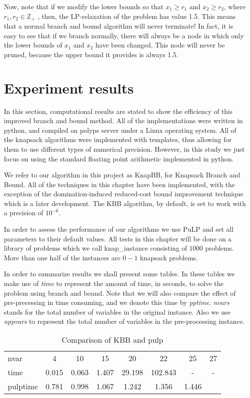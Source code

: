 \documentclass[a4paper,11pt]{article}
\begin{document}
Now, note that if we modify the lower bounds so that $x_1\geq r_1$ and $x_2 \geq r_2$, where $r_1 , r_2 \in \mathbb Z_+$ , then, the LP-relaxation of the problem has value 1.5. This means that a normal branch and bound algorithm will never terminate! In fact, it is easy to see that if we branch normally, there will always be a node in which only the lower bounds of $x_1$ and $x_2$ have been changed. This node will never be pruned, because the upper bound it provides is always 1.5.

\section{Experiment results}
In this section, computational results are stated to show the efficiency of this improved branch and bound method. All of the implementations were written in python, and compiled on polyps server under a Linux operating system. All of the knapsack algorithms were implemented with templates, thus allowing for them to use different types of numerical precision. However, in this study we just focus on using the standard floating point arithmetic implemented in python.

We refer to our algorithm in this project as KnapBB, for Knapsack Branch and Bound. All of the techniques in this chapter have been implemented, with the exception of the domination-induced reduced-cost bound improvement technique which is a later development. The KBB algorithm, by default, is set to work with a precision of $10^{-6}$.

In order to assess the performance of our algorithms we use PuLP and set all parameters to their default values. All tests in this chapter will be done on a library of problems which we call knap\_instance consisting of $1000$ problems. More than one half of the instances are $0-1$ knapsack problems. 

In order to summarize results we shall present some tables. In these tables we make use of \textit{time} to represent the amount of time, in seconds, to solve the problem using branch and bound. Note that we will also compare the effect of pre-precessing in time consuming, and we denote this time by \textit{pptime}.  \textit{nvars} stands for the total number of variables in the original instance. Also we use \textit{nppvars} to represent the total number of variables in the pre-processing instance.

\begin{table}[H]
\begin{center}
\begin{tabular}{l c c c c c c c}
\hline
nvar&4&10&15&20&22&25&27\\
time&0.015&0.063&1.407&29.198&102.843&-&-\\
pulptime&0.781&0.998&1.067&1.242&1.356&1.446\\
\hline
\end{tabular}
\end{center}
\caption{Comparison of KBB and pulp\label{numtab}}
\end{table}
\end{document}
